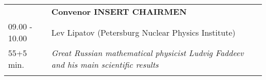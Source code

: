 \begin{longtable}{p{3cm}p{13cm}}
&\hfill {\bf Convenor INSERT CHAIRMEN }\\ 
09.00 - 10.00 & Lev Lipatov (Petersburg Nuclear Physics Institute)\\ 
55+5 min. & {\it Great Russian mathematical physicist Ludvig Faddeev and his main scientific results}\\ 
 & \\ 
\end{longtable}

